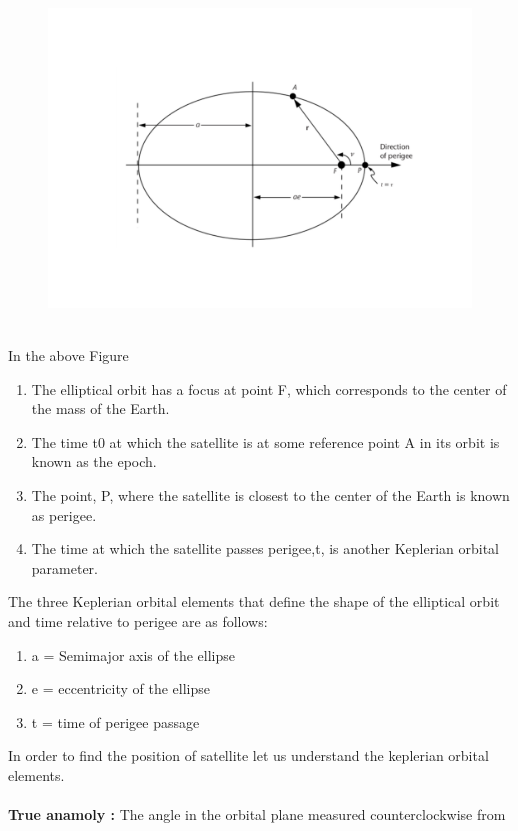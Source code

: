 \documentclass[10pt]{book}
\begin{document}
\begin{figure}
\includegraphics[scale=0.4]{./figs/1.pdf}
\end{figure}
\vspace{30cm}
\\
In the above Figure 
\begin{enumerate}
\item The elliptical orbit has a focus at point
F, which corresponds to the center of the mass of the Earth.
\item The time t0 at which the satellite is at some
reference point A in its orbit is known as the epoch.
\item The point, P, where the satellite is closest to the center of the Earth
is known as perigee.
\item The time at which the satellite passes perigee,t, is another
Keplerian orbital parameter.
\end{enumerate}
\vspace{5mm}
The three Keplerian orbital elements
that define the shape of the elliptical orbit and time relative to perigee are as
follows:
\begin{enumerate}
  \item a = Semimajor axis of the ellipse
  \item e = eccentricity of the ellipse
  \item t = time of perigee passage
\end{enumerate}
In order to find the position of satellite let us understand the keplerian orbital elements.\\
\\
\textbf{True anamoly :} The angle in the orbital plane measured counterclockwise from
\end{document}
